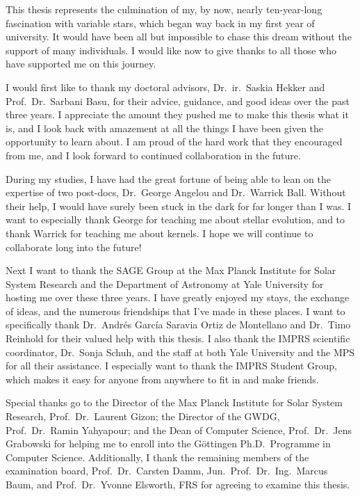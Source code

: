This thesis represents the culmination of my, by now, nearly ten-year-long fascination with variable stars, which began way back in my first year of university. 
It would have been all but impossible to chase this dream without the support of many individuals. 
I would like now to give thanks to all those who have supported me on this journey. 

I would first like to thank my doctoral advisors, Dr.\ ir.\ Saskia Hekker and Prof.\ Dr.\ Sarbani Basu, for their advice, guidance, and good ideas over the past three years. 
I appreciate the amount they pushed me to make this thesis what it is, and I look back with amazement at all the things I have been given the opportunity to learn about. 
I am proud of the hard work that they encouraged from me, and I look forward to continued collaboration in the future. 

During my studies, I have had the great fortune of being able to lean on the expertise of two post-docs, Dr.\ George Angelou and Dr.\ Warrick Ball. 
Without their help, I would have surely been stuck in the dark for far longer than I was. 
I want to especially thank George for teaching me about stellar evolution, and to thank Warrick for teaching me about kernels. 
I hope we will continue to collaborate long into the future! 

Next I want to thank the SAGE Group at the Max Planck Institute for Solar System Research and the Department of Astronomy at Yale University for hosting me over these three years. 
I have greatly enjoyed my stays, the exchange of ideas, and the numerous friendships that I've made in these places. 
I want to specifically thank Dr.\ Andr\'es Garc\'ia Saravia Ortiz de Montellano and Dr.\ Timo Reinhold for their valued help with this thesis. 
I also thank the IMPRS scientific coordinator, Dr.\ Sonja Schuh, and the staff at both Yale University and the MPS for all their assistance. 
I especially want to thank the IMPRS Student Group, which makes it easy for anyone from anywhere to fit in and make friends. 
%

Special thanks go to the Director of the Max Planck Institute for Solar System Research, Prof.\ Dr.\ Laurent Gizon; the Director of the GWDG, Prof.\ Dr.\ Ramin Yahyapour; and the Dean of Computer Science, Prof.\ Dr.\ Jens Grabowski for helping me to enroll into the 
%
%
G\"ottingen Ph.D.\ Programme in Computer Science. 
Additionally, I thank the remaining members of the examination board, Prof.\ Dr.\ Carsten Damm, Jun.\ Prof.\ Dr.\ Ing.\ Marcus Baum, and Prof.\ Dr.\ Yvonne Elsworth, FRS for agreeing to examine this thesis. 

